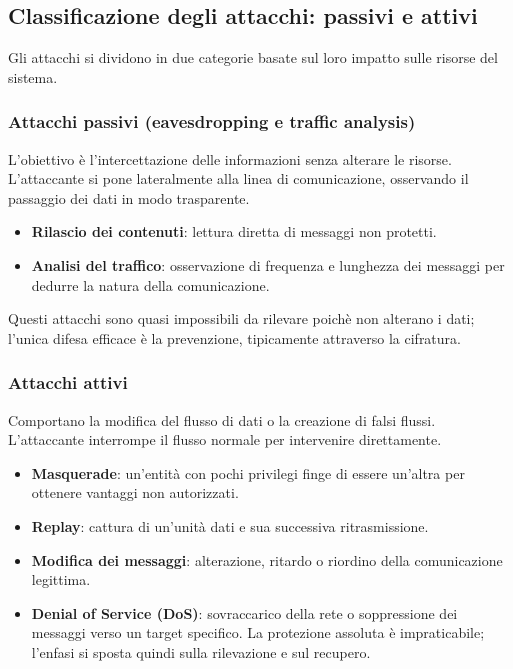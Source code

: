 \subsection{Classificazione degli attacchi: passivi e attivi}

Gli attacchi si dividono in due categorie basate sul loro impatto sulle risorse
del sistema.

\subsubsection{Attacchi passivi (eavesdropping e traffic analysis)}

L'obiettivo è l'intercettazione delle informazioni senza alterare le risorse.
L'attaccante si pone lateralmente alla linea di comunicazione, osservando il
passaggio dei dati in modo trasparente.

\begin{itemize}
\item \textbf{Rilascio dei contenuti}: lettura diretta di messaggi non protetti.
\item \textbf{Analisi del traffico}: osservazione di frequenza e lunghezza dei
messaggi per dedurre la natura della comunicazione.
\end{itemize}

Questi attacchi sono quasi impossibili da rilevare poichè non alterano i dati;
l'unica difesa efficace è  la prevenzione, tipicamente attraverso la cifratura.

\subsubsection{Attacchi attivi}

Comportano la modifica del flusso di dati o la creazione di falsi flussi.
L'attaccante interrompe il flusso normale per intervenire direttamente.

\begin{itemize}
\item \textbf{Masquerade}: un'entità con pochi privilegi finge di essere
un'altra per ottenere vantaggi non autorizzati.
\item \textbf{Replay}: cattura di un'unità dati e sua successiva ritrasmissione.
\item \textbf{Modifica dei messaggi}: alterazione, ritardo o riordino della
comunicazione legittima.
\item \textbf{Denial of Service (DoS)}: sovraccarico della rete o soppressione
dei messaggi verso un target specifico. La protezione assoluta è impraticabile;
l'enfasi si sposta quindi sulla rilevazione e sul recupero.
\end{itemize}

